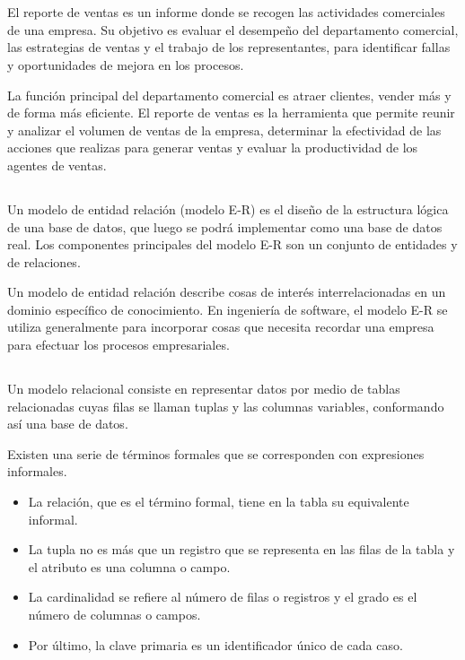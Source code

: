 \documentclass[10pt,a4paper]{article}
\begin{document}

\tableofcontents 
\pagebreak

\listoffigures
\pagebreak

\section{\color{colorIPN}{Introducción}}
El reporte de ventas es un informe donde se recogen las actividades comerciales de una empresa. Su objetivo es evaluar el desempeño del departamento comercial, las estrategias de ventas y el trabajo de los representantes, para  identificar fallas y oportunidades de mejora en los procesos. 

La función principal del departamento comercial es atraer clientes, vender más y de forma más eficiente. El reporte de ventas es la herramienta que permite reunir y analizar el volumen de ventas de la empresa, determinar la efectividad de las acciones que realizas para generar ventas y evaluar la productividad de los agentes de ventas.

\subsection{ \color{colorESCOM}{Modelo E-R}}
Un modelo de entidad relación (modelo E-R) es el diseño de la estructura lógica de una base de datos, que luego se podrá implementar como una base de datos real. Los componentes principales del modelo E-R son un conjunto de entidades y de relaciones.

Un modelo de entidad relación describe cosas de interés interrelacionadas en un dominio específico de conocimiento. En ingeniería de software, el modelo E-R se utiliza generalmente para incorporar cosas que necesita recordar una empresa para efectuar los procesos empresariales.

\subsection{ \color{colorESCOM}{Modelo Relacional}}
Un modelo relacional consiste en representar datos por medio de tablas relacionadas cuyas filas se llaman tuplas y las columnas variables, conformando así una base de datos.

Existen una serie de términos formales que se corresponden con expresiones informales.

\begin{itemize}
	\item La relación, que es el término formal, tiene en la tabla su equivalente informal.
	\item La tupla no es más que un registro que se representa en las filas de la tabla y el atributo es una columna o campo.
	\item La cardinalidad se refiere al número de filas o registros y el grado es el número de columnas o campos.
	\item Por último, la clave primaria es un identificador único de cada caso.
\end{itemize}
\end{document}
